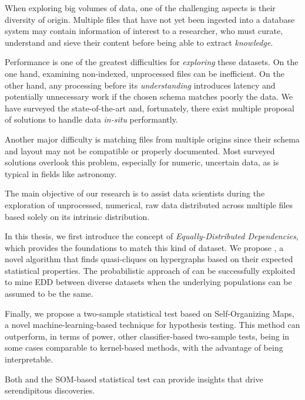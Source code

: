 {\fontsize{11}{11}\selectfont
When exploring big volumes of data, one of the challenging aspects
is their diversity of origin. Multiple files that have not yet been ingested into a
database system may contain information of interest to a researcher,
who must curate, understand and sieve their content before being able to 
extract \emph{knowledge}.

Performance is one of the greatest difficulties for \emph{exploring} these datasets.
On the one hand, examining non-indexed, unprocessed files can be inefficient. On the
other hand, any processing before its \emph{understanding} introduces latency and
potentially unnecessary work if the chosen schema matches poorly the data.
We have surveyed the state-of-the-art and, fortunately, there exist multiple
proposal of solutions to handle data \emph{in-situ} performantly.

Another major difficulty is matching files from multiple origins since their
schema and layout may not be compatible or properly documented. Most surveyed solutions overlook this problem, especially for numeric, uncertain data, as is typical
in fields like astronomy.

The main objective of our research is to assist data scientists during the exploration of 
unprocessed, numerical, raw data distributed across multiple files based solely on its
intrinsic distribution.

In this thesis, we first introduce the concept of \emph{Equally-Distributed Dependencies}, which
provides the foundations to match this kind of dataset.
We propose \PresQ, a novel algorithm that finds quasi-cliques on hypergraphs based
on their expected statistical properties. The probabilistic approach of \PresQ can be
successfully exploited to mine EDD between diverse datasets when the underlying populations
can be assumed to be the same.

Finally, we propose a two-sample statistical test based on Self-Organizing Maps,
a novel machine-learning-based technique for hypothesis testing. This method
can outperform, in terms of power, other classifier-based two-sample tests, being in some cases
comparable to kernel-based methods, with the advantage of being interpretable.

Both \PresQ and the SOM-based statistical test can provide insights that drive serendipitous discoveries.
}
